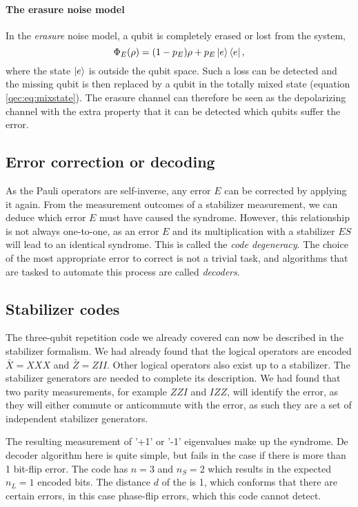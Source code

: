 \paragraph{The erasure noise model}
In the \emph{erasure} noise model, a qubit is completely erased or lost from the system,
\begin{equation}\label{qec:eq:erasure}
  \Phi_E(\rho) = (1-p_E)\rho + p_E\ket{e}\bra{e},
\end{equation}
where the state $\ket{e}$ is outside the qubit space. Such a loss can be detected and the missing qubit is then replaced by a qubit in the totally mixed state (equation \ref{qec:eq:mixstate}). The erasure channel can therefore be seen as the depolarizing channel with the extra property that it can be detected which qubits suffer the error.


\subsection{Error correction or decoding}

As the Pauli operators are self-inverse, any error $E$ can be corrected by applying it again. From the measurement outcomes of a stabilizer measurement, we can deduce which error $E$ must have caused the syndrome. However, this relationship is not always one-to-one, as an error $E$ and its multiplication with a stabilizer $ES$ will lead to an identical syndrome. This is called the \emph{code degeneracy}. The choice of the most appropriate error to correct is not a trivial task, and algorithms that are tasked to automate this process are called \emph{decoders}.

\subsection{Stabilizer codes}

The three-qubit repetition code we already covered can now be described in the stabilizer formalism. We had already found that the logical operators are encoded $\bar{X} = XXX$ and $\bar{Z} = ZII$. Other logical operators also exist up to a stabilizer. The stabilizer generators are needed to complete its description. We had found that two parity measurements, for example $ZZI$ and $IZZ$, will identify the error, as they will either commute or anticommute with the error, as such they are a set of independent stabilizer generators. 

The resulting measurement of '+1' or '-1' eigenvalues make up the syndrome. De decoder algorithm here is quite simple, but fails in the case if there is more than 1 bit-flip error. The code has $n=3$ and $n_S=2$ which results in the expected $n_L = 1$ encoded bits. The distance $d$ of the is 1, which conforms that there are certain errors, in this case phase-flip errors, which this code cannot detect.

